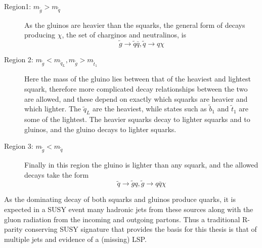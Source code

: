 \begin{description}
\item[Region1: $m_{\tilde{g}} > m_{\tilde{q}}$]{As the gluinos are heavier than the squarks, the general form of decays producing $\chi$, the set of charginos and neutralinos, is
\begin{equation}
\tilde{g} \rightarrow \tilde{q} \bar{q} , \tilde{q} \rightarrow q \chi
\end{equation}
}
\item[Region 2: $m_{\tilde{g}}< m_{\tilde{q}_{L}}, m_{\tilde{g}}> m_{\tilde{t}_{1}} $]{Here the mass of the gluino lies between that of the heaviest and lightest squark, therefore more complicated decay relationships between the two are allowed, and these depend on exactly which squarks are heavier and which lighter. The $\tilde{q}_{L}$ are the heaviest, while states such as $\tilde{b}_{1}$ and $\tilde{t}_{1}$ are some of the lightest. The heavier squarks decay to lighter squarks and to gluinos, and the gluino decays to lighter squarks. }
\item[Region 3: $m_{\tilde{g}} < m_{\tilde{q}}$]{Finally in this region the gluino is lighter than any squark, and the allowed decays take the form
\begin{equation}
\tilde{q} \rightarrow \tilde{g}q , \tilde{g} \rightarrow q\bar{q} \chi
\end{equation}
}
\end{description}

As the dominating decay of both squarks and gluinos produce quarks, it is expected in a SUSY event many hadronic jets from these sources along with the gluon radiation from the incoming and outgoing partons. Thus a traditional R-parity conserving SUSY signature that provides the basis for this thesis is that of multiple jets and evidence of a (missing) LSP. 




